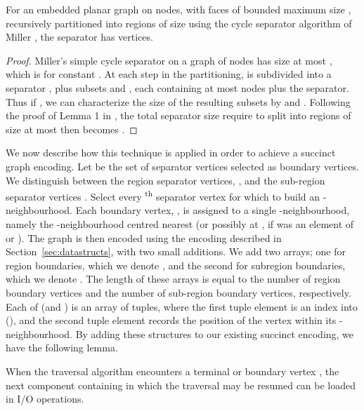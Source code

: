 \begin{lemma}
  \label{lem:cycle_sep_size}
  For an embedded planar graph  on  nodes, with faces of
  bounded maximum size , recursively partitioned into regions of
  size  using the cycle separator algorithm of Miller
  \cite{miller_1986}, the separator  has 
  vertices.
\end{lemma}

\begin{proof}
  Miller's simple cycle separator on a graph of  nodes has size at
  most , which
  is  for constant . At each step in the
  partitioning,  is subdivided into a separator , plus subsets  and , each containing at
  most  nodes plus the separator. Thus if , we can characterize the size of the
  resulting subsets by  and
  . Following the proof of
  Lemma 1 in \cite{Frederickson87}, the total separator size require to
  split  into regions of size at most  then becomes
  .
\end{proof}

We now describe how this technique is applied in order to achieve a succinct graph
encoding. 
Let  be the set of separator vertices selected as boundary
vertices.
We distinguish between the region separator vertices, 
, and the sub-region separator vertices .
Select every \textsuperscript{th} separator vertex 
for which to build an -neighbourhood.
Each boundary vertex, , is assigned to a single -neighbourhood, namely
the -neighbourhood centred nearest  (or possibly at
, if  was an element of  or ). 
The graph is then encoded using the encoding described in 
Section~\ref{sec:datastructs}, with two small additions.
We add two arrays; one for region boundaries, which we denote 
, and the second for subregion boundaries,
which we denote .
The length of these arrays is equal to the number of region boundary 
vertices and the number of sub-region boundary vertices, respectively.
Each of  (and ) is an array of tuples, where
the first tuple element is an index into  (), 
and the second tuple element records the position of the vertex within
its -neighbourhood. 
By adding these structures to our existing succinct encoding, we have the
 following lemma.

\begin{lemma}
\label{lem:ptable_ios}
When the traversal algorithm encounters a terminal or boundary
vertex , the next component containing  in which the traversal
may be resumed can be loaded in  I/O operations.
\end{lemma}


